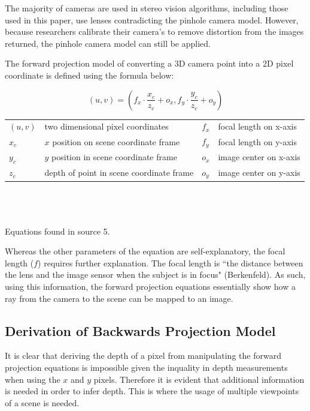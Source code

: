 \documentclass[11pt]{scrartcl}
\begin{document}
\begin{remark}
	The majority of cameras are used in stereo vision algorithms, including those
	used in this paper, use lenses contradicting the pinhole camera model.
	However, because researchers calibrate their camera's to remove
	distortion from the images returned, the pinhole camera model can still
	be applied.
\end{remark}
The forward projection model of converting a 3D camera point into a 2D pixel
coordinate is defined using the formula below:
\begin{theorem}
	[Forward Projection Equation]
	
	\begin{displaymath}
		(u, v) = (f_x \cdot \displaystyle\frac{x_c}{z_c} + o_x,
		f_y \cdot \displaystyle\frac{y_c}{z_c} + o_y)
	\end{displaymath}
	\begin{figurekey}
		\begin{tabular}{llll}
			$(u,v)$ & two dimensional pixel coordinates        & $f_x$ & focal length on x-axis \\
			$x_c$   & $x$ position on scene coordinate frame   & $f_y$ & focal length on y-axis \\
			$y_c$   & $y$ position in scene coordinate frame   & $o_x$ & image center on x-axis \\
			$z_c$   & depth of point in scene coordinate frame & $o_y$ & image center on y-axis \\
		\end{tabular}
	\end{figurekey}
	\\ \\ \\
	Equations found in source 5.
\end{theorem}
Whereas the other parameters of the equation are self-explanatory, the focal
length ($f$) requires further explanation. The focal length is ``the distance
between the lens and the image sensor when the subject is in focus" (Berkenfeld).
As such, using this information, the forward projection equations essentially show how a ray from the camera to the scene can be mapped to an image.

\subsection{Derivation of Backwards Projection Model}
It is clear that deriving the depth of a pixel from manipulating the forward
projection equations is impossible given the inquality in depth measurements
when using the $x$ and $y$ pixels. Therefore it is evident that additional
information is needed in order to infer depth. This is where the usage of
multiple viewpoints of a scene is needed.
\end{document}

